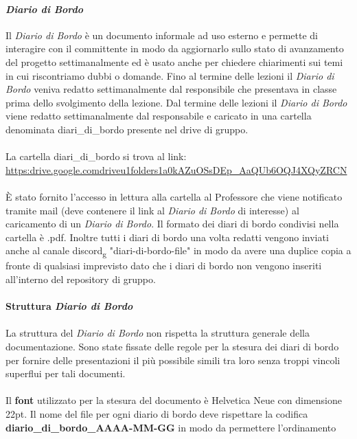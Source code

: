 \paragraph{\textit{Diario di Bordo}}
Il \textit{Diario di Bordo} è un documento informale ad uso esterno e permette di interagire con il committente in modo da aggiornarlo sullo stato di avanzamento del progetto settimanalmente ed è usato 
anche per chiedere chiarimenti sui temi in cui riscontriamo dubbi o domande.
Fino al termine delle lezioni il \textit{Diario di Bordo} veniva redatto settimanalmente dal responsibile che presentava in classe prima dello svolgimento 
della lezione.
Dal termine delle lezioni il \textit{Diario di Bordo} viene redatto settimanalmente dal responsabile e caricato in una cartella denominata diari\_di\_bordo presente nel drive di gruppo.
\\\\
La cartella diari\_di\_bordo si trova al link: \href{https://drive.google.com/drive/u/1/folders/1a0kAZuOSsDEp_AaQUb6OQJ4XQyZ--RCN}{\\https:\/\/drive.google.com\/drive\/u\/1\/folders\/1a0kAZuOSsDEp\_AaQUb6OQJ4XQyZ\-\-RCN}
\\\\
È stato fornito l'accesso in lettura alla cartella al Professore che viene notificato tramite mail (deve contenere il link al \textit{Diario di Bordo} di interesse) al caricamento di un \textit{Diario di Bordo}.
Il formato dei diari di bordo condivisi nella cartella è .pdf.
Inoltre tutti i diari di bordo una volta redatti vengono inviati anche al canale discord\textsubscript{g} "diari-di-bordo-file" in modo da avere una duplice copia a fronte di 
qualsiasi imprevisto dato che i diari di bordo non vengono inseriti all'interno del repository di gruppo.
\\\\
\textbf{Struttura \textit{Diario di Bordo}} 
\\\\
La struttura del \textit{Diario di Bordo} non rispetta la struttura generale della documentazione.
Sono state fissate delle regole per la stesura dei diari di bordo per fornire delle presentazioni il più possibile simili tra loro 
senza troppi vincoli superflui per tali documenti.
\\\\
Il \textbf{font} utilizzato per la stesura del documento è Helvetica Neue con dimensione 22pt.
Il nome del file per ogni diario di bordo deve rispettare la codifica \textbf{diario\_di\_bordo\_AAAA-MM-GG} in modo da permettere l'ordinamento
